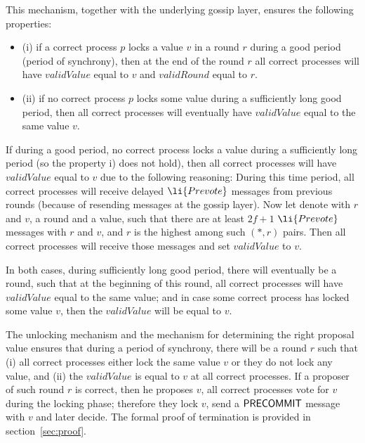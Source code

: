 This mechanism, together with the underlying gossip layer, ensures the following properties:
\begin{itemize} 
	\item (i) if a correct process $p$ locks a value $v$ in a round $r$ during a good period (period of synchrony), then at the end of the round $r$ all correct processes will have $validValue$ equal to $v$ and $validRound$ equal to $r$.
	\item (ii) if no correct process $p$ locks some value during a sufficiently long good period, then all correct processes will eventually have $validValue$ equal to the same value $v$.
\end{itemize} 

If during a good period, no correct process locks a value during a sufficiently long period (so the property i) does not hold), then
all correct processes will have $validValue$ equal to $v$ due to the following reasoning: During this time period, all correct processes will receive delayed $\li{Prevote}$ messages from previous rounds (because of resending messages at the gossip layer). Now let denote with $r$ and $v$, a round and a value, such that there are at least $2f+1$ $\li{Prevote}$ messages with $r$ and $v$, and $r$ is the highest among such $(*, r)$ pairs. Then all correct processes will receive those messages and set $validValue$ to $v$.

In both cases, during sufficiently long good period, there will eventually be a round, such that at the beginning of this round, all correct processes will have $validValue$ equal to the same value; and in case some correct process has locked some value $v$, then the $validValue$ will be equal to $v$. 

The unlocking mechanism and the mechanism for determining the right proposal value ensures that during a period of synchrony, there will be a round $r$ such that (i) all correct processes either lock the same value $v$ or they do not lock any value, and (ii) the $validValue$ is equal to $v$ at all correct processes. If a proposer of such round $r$ is correct, then he proposes $v$, all correct processes vote for $v$ during the locking phase; therefore they lock $v$, send a $\mathsf{PRECOMMIT}$ message with $v$ and later decide. The formal proof of termination is provided in section~\ref{sec:proof}.


